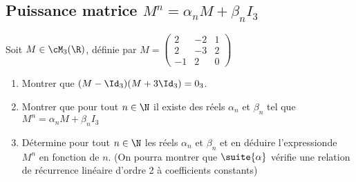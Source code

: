 \subsection{Puissance matrice $M^n =\alpha_n M +\beta_n I_3$ }


\begin{exercice}
Soit $M \in\cM_3(\R) $, définie par 
$ M =\left( 
\begin{array}{ccc}
2 & -2 & 1\\
2 & -3 & 2\\
-1 & 2 & 0
\end{array}
\right)$
\begin{enumerate}
\item Montrer que $(M-\Id_3) (M+3\Id_3)=0_3$.
\item Montrer que pour tout $n\in \N$ il existe des réels $\alpha_n $ et $\beta_n$ tel que $M^n =\alpha_n M +\beta_n I_3$
\item Détermine pour tout $n\in \N$ les réels $\alpha_n$ et $\beta_n$ et en déduire l'expressionde $M^n$ en fonction de $n$.  (On pourra montrer que $\suite{\alpha}$ vérifie une relation de récurrence linéaire d'ordre 2 à coefficients constants) 
\end{enumerate}


\end{exercice}

